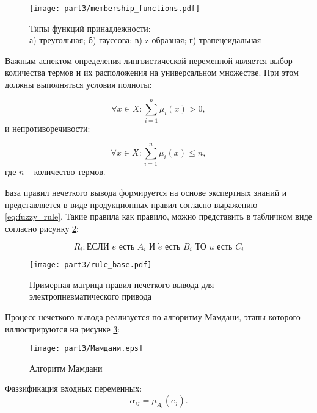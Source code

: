 \begin{figure}[ht]
\centering
\texttt{[image: part3/membership\_functions.pdf]}
\caption{Типы функций принадлежности:\\
а) треугольная; б) гауссова; в) z-образная; г) трапецеидальная}
\label{fig:membership_functions_types}
\end{figure}

Важным аспектом определения лингвистической переменной является выбор
количества термов и их расположения
на универсальном множестве. При этом должны выполняться условия полноты:

\begin{equation*}
\forall x \in X: \sum_{i=1}^n \mu_i(x) > 0,
\end{equation*}
и непротиворечивости:

\begin{equation}
\forall x \in X: \sum_{i=1}^n \mu_i(x) \leq n,
\end{equation}
где $n$ -- количество термов.

База правил нечеткого вывода формируется на основе экспертных знаний
и представляется в виде продукционных правил согласно выражению \ref{eq:fuzzy_rule}. Такие правила как правило,
можно представить в табличном виде согласно рисунку \ref{fig:fuzzy_rules}:

\begin{equation}\label{eq:fuzzy_rule}
R_i: \text{ЕСЛИ } e \text{ есть } A_i \text{ И } \dot{e} \text{ есть } B_i \text{ ТО } u \text{ есть } C_i
\end{equation}

\begin{figure}[ht]
\centering
\texttt{[image: part3/rule\_base.pdf]}
\caption{Примерная матрица правил нечеткого вывода для электропневматического привода}
\label{fig:fuzzy_rules}
\end{figure}

Процесс нечеткого вывода реализуется по алгоритму Мамдани,
этапы которого иллюстрируются на рисунке \ref{fig:fuzzy_inference}:

\begin{figure}[ht]
\centering
\texttt{[image: part3/Мамдани.eps]}
\caption{Алгоритм Мамдани}
\label{fig:fuzzy_inference}
\end{figure}

Фаззификация входных переменных:
\begin{equation*}
\alpha_{ij} = \mu_{A_i}(e_j).
\end{equation*}

